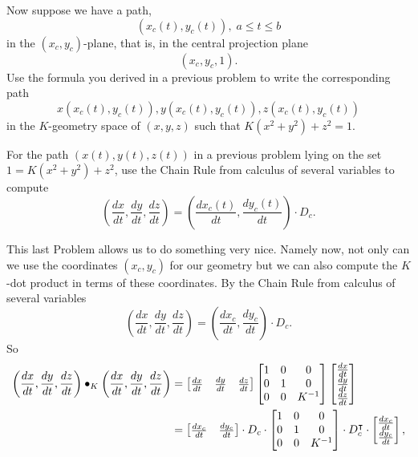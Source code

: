 \documentclass{ximera}
\begin{document}
\begin{problem}
\label{prev}Now suppose we have a path,%
\[
\left(  x_{c}\left(  t\right)  ,y_{c}\left(  t\right)  \right)  ,\;a\leq t\leq
b
\]
in the $\left(  x_{c},y_{c}\right)  $-plane, that is, in the central
projection plane%
\[
\left(  x_{c},y_{c},1\right)  .
\]
Use the formula you derived in a previous problem to write the
corresponding path%
\[
x\left(  x_{c}\left(  t\right)  ,y_{c}\left(  t\right)  \right)  ,y\left(
x_{c}\left(  t\right)  ,y_{c}\left(  t\right)  \right)  ,z\left(  x_{c}\left(
t\right)  ,y_{c}\left(  t\right)  \right)
\]
in the $K$-geometry space of $\left(  x,y,z\right)  $ such that $K\left(
x^{2}+y^{2}\right)  +z^{2}=1$.
\end{problem}

\begin{problem}
For the path $\left( x\left( t\right) ,y\left( t\right) ,z\left(
t\right) \right) $ in a previous problem lying on the set
$1=K\left(x^{2}+y^{2}\right)+z^{2} $, use the Chain Rule from calculus
of several variables to compute%
\[
\left(  \frac{dx}{dt},\frac{dy}{dt},\frac{dz}{dt}\right)  =\left(
\frac{dx_{c}\left(  t\right)  }{dt},\frac{dy_{c}\left(  t\right)  }%
{dt}\right)  \cdot D_{c}.
\]

\end{problem}

This last Problem allows us to do something very nice. Namely now, not only
can we use the coordinates $\left(  x_{c},y_{c}\right)  $ for our geometry but
we can also compute the $K$-dot product in terms of these coordinates. By the
Chain Rule from calculus of several variables%
\[
\left(  \frac{dx}{dt},\frac{dy}{dt},\frac{dz}{dt}\right)  =\left(
\frac{dx_{c}}{dt},\frac{dy_{c}}{dt}\right)  \cdot D_{c}.
\]
So%
\begin{align*}
\left(  \frac{dx}{dt},\frac{dy}{dt},\frac{dz}{dt}\right)  \bullet_{K}\left(
\frac{dx}{dt},\frac{dy}{dt},\frac{dz}{dt}\right)   &  =\begin{bmatrix}
\frac{dx}{dt} & \frac{dy}{dt} & \frac{dz}{dt}%
\end{bmatrix} \begin{bmatrix}
1 & 0 & 0\\
0 & 1 & 0\\
0 & 0 & K^{-1}%
\end{bmatrix} \begin{bmatrix}
\frac{dx}{dt}\\
\frac{dy}{dt}\\
\frac{dz}{dt}%
\end{bmatrix}\\
&  =
\begin{bmatrix}
\frac{dx_{c}}{dt} & \frac{dy_{c}}{dt}%
\end{bmatrix} \cdot D_{c}\cdot\begin{bmatrix}
1 & 0 & 0\\
0 & 1 & 0\\
0 & 0 & K^{-1}%
\end{bmatrix} \cdot D_{c}^\transpose\cdot
\begin{bmatrix}
\frac{dx_{c}}{dt}\\
\frac{dy_{c}}{dt}%
\end{bmatrix},
\end{align*}
\end{document}
